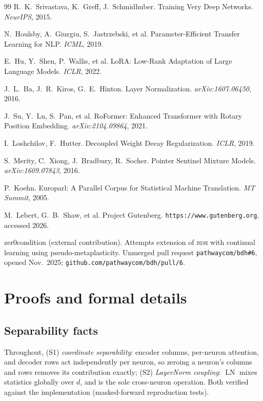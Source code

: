 \documentclass[11pt]{article}
\theoremstyle{definition}\newtheorem{definition}{Definition}
\theoremstyle{remark}\newtheorem{remark}{Remark}
\newcommand{\BDH}{\textsc{bdh}}
\begin{document}
\begin{thebibliography}{99}
R.~K.~Srivastava, K.~Greff, J.~Schmidhuber.
\newblock Training Very Deep Networks.
\newblock \emph{NeurIPS}, 2015.

N.~Houlsby, A.~Giurgiu, S.~Jastrzebski, et al.
\newblock Parameter-Efficient Transfer Learning for NLP.
\newblock \emph{ICML}, 2019.

E.~Hu, Y.~Shen, P.~Wallis, et al.
\newblock LoRA: Low-Rank Adaptation of Large Language Models.
\newblock \emph{ICLR}, 2022.

J.~L.~Ba, J.~R.~Kiros, G.~E.~Hinton.
\newblock Layer Normalization.
\newblock \emph{arXiv:1607.06450}, 2016.

J.~Su, Y.~Lu, S.~Pan, et al.
\newblock RoFormer: Enhanced Transformer with Rotary Position Embedding.
\newblock \emph{arXiv:2104.09864}, 2021.

I.~Loshchilov, F.~Hutter.
\newblock Decoupled Weight Decay Regularization.
\newblock \emph{ICLR}, 2019.

S.~Merity, C.~Xiong, J.~Bradbury, R.~Socher.
\newblock Pointer Sentinel Mixture Models.
\newblock \emph{arXiv:1609.07843}, 2016.

P.~Koehn.
\newblock Europarl: A Parallel Corpus for Statistical Machine Translation.
\newblock \emph{MT Summit}, 2005.

M.~Lebert, G.~B.~Shaw, et al.
\newblock Project Gutenberg.
\newblock \texttt{https://www.gutenberg.org}, accessed 2026.

zer0condition (external contribution).
\newblock Attempts extension of \BDH{} with continual learning using pseudo-metaplasticity.
\newblock Unmerged pull request \texttt{pathwaycom/bdh\#6}, opened Nov.\ 2025;
\texttt{github.com/pathwaycom/bdh/pull/6}.

\end{thebibliography}

\appendix

\section{Proofs and formal details}\label{app:proofs}

\subsection{Separability facts}
Throughout, (S1) \emph{coordinate separability}: encoder columns, per-neuron attention, and
decoder rows act independently per neuron, so zeroing a neuron's columns and rows removes
its contribution exactly; (S2) \emph{LayerNorm coupling}: $\operatorname{LN}$ mixes
statistics globally over $d$, and is the sole cross-neuron operation. Both verified against
the implementation (masked-forward reproduction tests).
\end{document}
